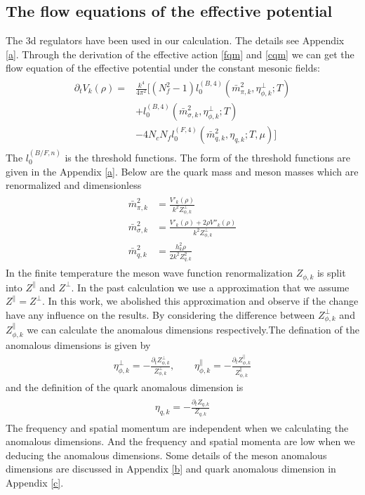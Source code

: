 \documentclass[%
reprint,
superscriptaddress,
showpacs,preprintnumbers,
 amsmath,amssymb,
 aps,
prd,
]{revtex4-1}
\begin{document}
\subsection{The flow equations of the effective potential}
The 3d regulators have been used in our calculation. The details see Appendix \ref{a}. Through the derivation of the 
effective action \ref{fqm} and \ref{cqm} we can get the flow equation of the effective potential under the constant mesonic
fields:
\begin{align}
\begin{split}
\partial_tV_k(\rho)=&\frac{k^4}{4\pi^2}[(N^2_f-1)l^{(B,4)}_{0}(\bar{m}^{2}_{\pi,k},\eta^{\bot}_{\phi,k};T)\\
&+l^{(B,4)}_{0}(\bar{m}^{2}_{\sigma,k},\eta^{\bot}_{\phi,k};T)\\
&-4N_cN_fl^{(F,4)}_{0}(\bar{m}^{2}_{q,k},\eta_{q,k};T,\mu)]
\end{split}
\end{align}
The $l_0^{(B/F,n)}$ is the threshold functions. The form of the threshold functions are given in the Appendix \ref{a}. Below 
are the quark mass and meson masses which are renormalized and dimensionless
\begin{align}
\begin{split}
\bar{m}^{2}_{\pi,k}&=\frac{V'_k(\rho)}{k^2Z^{\bot}_{\phi,k}}\\
\bar{m}^{2}_{\sigma,k}&=\frac{V'_k(\rho)+2\rho V''_k(\rho)}{k^2Z^{\bot}_{\phi,k}}\\
\bar{m}^{2}_{q,k}&=\frac{h^{2}_{k}\rho}{2k^2Z^{2}_{q,k}}
\end{split}
\end{align}
In the finite temperature the meson wave function renormalization $Z_{\phi,k}$ is split into $Z^\|$ and $Z^\bot$. In the past 
calculation we use a 
approximation that we assume $Z^\|=Z^\bot$. In this work, we abolished this approximation and observe if the change 
have any influence on the results.
By considering the difference between $Z^\bot_{\phi,k}$ and $Z^\|_{\phi,k}$ we can calculate the anomalous dimensions 
respectively.The defination of the 
anomalous dimensions is given by
\begin{align}
\eta_{\phi,k}^\bot=-\frac{\partial_tZ_{\phi,k}^\bot}{Z_{\phi,k}^\bot} ,\qquad \eta_{\phi,k}^\|=-\frac{\partial_tZ_{\phi,k}^\|}
{Z_{\phi,k}^\|}\label{eq:anodim}
\end{align}
and the definition of the quark anomalous dimension is
\begin{align}
\begin{split}
\eta_{q,k}=-\frac{\partial_tZ_{q,k}}{Z_{q,k}}
\end{split}
\end{align}
The frequency and spatial momentum are independent when we calculating the anomalous dimensions. And the 
frequency and spatial momenta are low when we deducing the anomalous dimensions. Some details of the meson 
anomalous dimensions are discussed in Appendix \ref{b} and quark anomalous dimension in Appendix \ref{c}.
\end{document}
